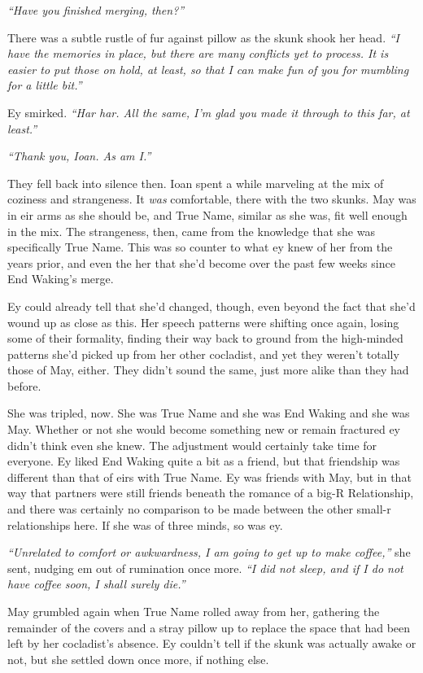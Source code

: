 \emph{``Have you finished merging, then?''}

There was a subtle rustle of fur against pillow as the skunk shook her head. \emph{``I have the memories in place, but there are many conflicts yet to process. It is easier to put those on hold, at least, so that I can make fun of you for mumbling for a little bit.''}

Ey smirked. \emph{``Har har. All the same, I'm glad you made it through to this far, at least.''}

\emph{``Thank you, Ioan. As am I.''}

They fell back into silence then. Ioan spent a while marveling at the mix of coziness and strangeness. It \emph{was} comfortable, there with the two skunks. May was in eir arms as she should be, and True Name, similar as she was, fit well enough in the mix. The strangeness, then, came from the knowledge that she was specifically True Name. This was so counter to what ey knew of her from the years prior, and even the her that she'd become over the past few weeks since End Waking's merge.

Ey could already tell that she'd changed, though, even beyond the fact that she'd wound up as close as this. Her speech patterns were shifting once again, losing some of their formality, finding their way back to ground from the high-minded patterns she'd picked up from her other cocladist, and yet they weren't totally those of May, either. They didn't sound the same, just more alike than they had before.

She was tripled, now. She was True Name and she was End Waking and she was May. Whether or not she would become something new or remain fractured ey didn't think even she knew. The adjustment would certainly take time for everyone. Ey liked End Waking quite a bit as a friend, but that friendship was different than that of eirs with True Name. Ey was friends with May, but in that way that partners were still friends beneath the romance of a big-R Relationship, and there was certainly no comparison to be made between the other small-r relationships here. If she was of three minds, so was ey.

\emph{``Unrelated to comfort or awkwardness, I am going to get up to make coffee,''} she sent, nudging em out of rumination once more. \emph{``I did not sleep, and if I do not have coffee soon, I shall surely die.''}

May grumbled again when True Name rolled away from her, gathering the remainder of the covers and a stray pillow up to replace the space that had been left by her cocladist's absence. Ey couldn't tell if the skunk was actually awake or not, but she settled down once more, if nothing else.

